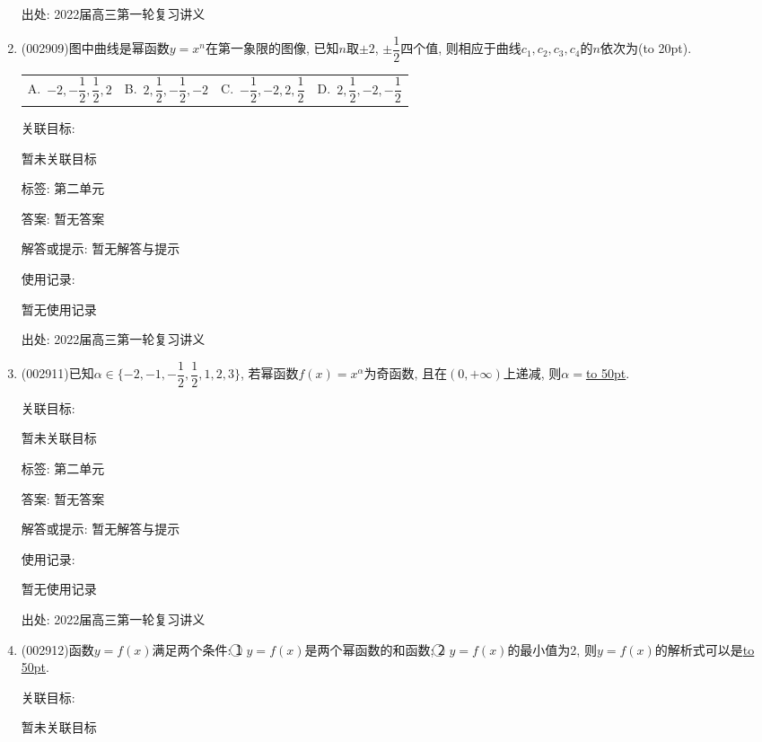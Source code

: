 \documentclass[10pt,a4paper]{article}
\newcommand{\blank}[1]{\underline{\hbox to #1pt{}}}
\newcommand{\bracket}[1]{(\hbox to #1pt{})}
\newcommand{\fourch}[4]{\par\begin{tabular}{p{.23\textwidth}p{.23\textwidth}p{.23\textwidth}p{.23\textwidth}}
A.~#1 &B.~#2& C.~#3& D.~#4
\end{tabular}}
\begin{document}
\begin{enumerate}[1.]
出处: 2022届高三第一轮复习讲义
\item { (002909)}图中曲线是幂函数$y=x^n$在第一象限的图像, 已知$n$取$\pm 2$, $\pm\dfrac 12$四个值, 则相应于曲线$c_1,c_2,c_3,c_4$的$n$依次为\bracket{20}.
\begin{center}
    \end{center}
\fourch{$-2,-\dfrac 12,\dfrac 12,2$}{$2,\dfrac 12,-\dfrac 12,-2$
}{$-\dfrac 12,-2,2,\dfrac 12$}{$2,\dfrac 12,-2,-\dfrac 12$}


关联目标:

暂未关联目标



标签: 第二单元

答案: 暂无答案

解答或提示: 暂无解答与提示

使用记录:

暂无使用记录


出处: 2022届高三第一轮复习讲义
\item { (002911)}已知$\alpha\in \{-2,-1,-\dfrac 12,\dfrac 12,1,2,3\}$, 若幂函数$f(x)=x^\alpha$为奇函数, 且在$(0,+\infty)$上递减, 则$\alpha=$\blank{50}.


关联目标:

暂未关联目标



标签: 第二单元

答案: 暂无答案

解答或提示: 暂无解答与提示

使用记录:

暂无使用记录


出处: 2022届高三第一轮复习讲义
\item { (002912)}函数$y=f(x)$满足两个条件:
\textcircled{1} $y=f(x)$是两个幂函数的和函数; \textcircled{2} $y=f(x)$的最小值为2, 则$y=f(x)$的解析式可以是\blank{50}.


关联目标:

暂未关联目标




\end{enumerate}
\end{document}

